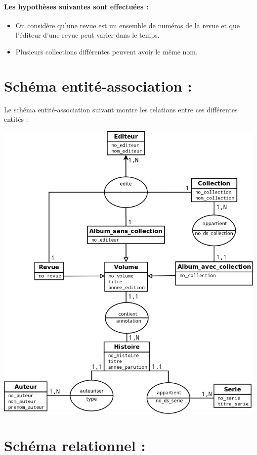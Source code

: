 \documentclass[12pt]{article}
\begin{document}
\paragraph{Les hypothèses suivantes sont effectuées :}
\begin{itemize}
	\item On considère qu'une revue est un ensemble de numéros de la revue et que l'éditeur d'une revue peut varier dans le temps.
	\item Plusieurs collections différentes peuvent avoir le même nom.
\end{itemize}


\section{Schéma entité-association :}

Le schéma entité-association suivant montre les relations entre ces
différentes entités :

\noindent\includegraphics[width=\textwidth]{schema-entite-association}


\section{Schéma relationnel :}
\end{document}

